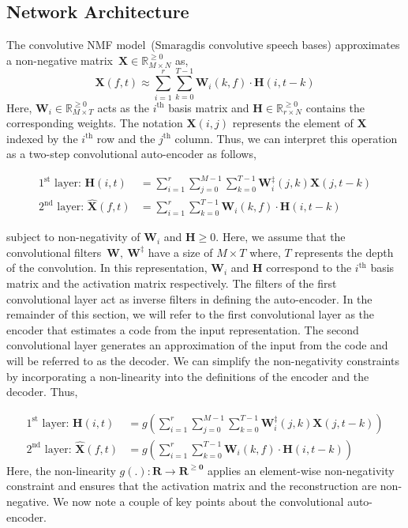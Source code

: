 \documentclass{article}
\begin{document}
\subsection{Network Architecture}
\label{sec:conv-nmf}
The convolutive NMF model~\cite{}(Smaragdis convolutive speech bases) approximates a non-negative matrix~$\mathbf{X}\in \mathbb{R}_{M \times N}^{\geq0}$ as,
\begin{equation}
    \mathbf{X}(f,t) \approx \sum_{i=1}^{r} \sum_{k=0}^{T-1} \mathbf{W}_{i}(k,f)\cdot\mathbf{H}(i,t-k)
\end{equation}
Here, $\mathbf{W}_{i} \in \mathbb{R}_{M \times T}^{\geq0}$ acts as the $i^{\text{th}}$ basis matrix and $\mathbf{H} \in \mathbb{R}_{r \times N}^{\geq0}$ contains the corresponding weights. The notation $\mathbf{X}(i,j)$ represents the element of $\mathbf{X}$ indexed by the $i^{\text{th}}$ row and the $j^{\text{th}}$ column. Thus, we can interpret this operation as a two-step convolutional auto-encoder as follows,

\begin{align}
    \text{$1^{\text{st}}$ layer:~}\mathbf{H}(i,t) &= \sum_{i=1}^{r} \sum_{j=0}^{M-1} \sum_{k=0}^{T-1} \mathbf{W}_{i}^{\ddagger}(j,k)\mathbf{X}(j,t-k) \\
    \text{$2^{\text{nd}}$ layer:~}\hat{\mathbf{X}}(f,t) &= \sum_{i=1}^{r} \sum_{k=0}^{T-1} \mathbf{W}_{i}(k,f)\cdot\mathbf{H}(i,t-k)
    \label{eq:nmfcnncnn}
\end{align}

subject to non-negativity of $\mathbf{W}_{i}$ and $\mathbf{H}\geq0$. Here, we assume that the convolutional filters~$\mathbf{W},~\mathbf{W}^{\ddagger}$ have a size of $M\times T$ where, $T$ represents the depth of the convolution. In this representation, $\mathbf{W}_{i}$ and $\mathbf{H}$ correspond to the $i^{\text{th}}$ basis matrix and the activation matrix respectively. The filters of the first convolutional layer act as inverse filters in defining the auto-encoder. In the remainder of this section, we will refer to the first convolutional layer as the encoder that estimates a code from the input representation. The second convolutional layer generates an approximation of the input from the code and will be referred to as the decoder. We can simplify the non-negativity constraints by incorporating a non-linearity into the definitions of the encoder and the decoder. Thus,

\begin{align}
    \text{$1^{\text{st}}$ layer:~}\mathbf{H}(i,t) &= g\left(\sum_{i=1}^{r} \sum_{j=0}^{M-1} \sum_{k=0}^{T-1} \mathbf{W}_{i}^{\ddagger}(j,k)\mathbf{X}(j,t-k)\right) \\
    \text{$2^{\text{nd}}$ layer:~}\hat{\mathbf{X}}(f,t) &= g\left(\sum_{i=1}^{r} \sum_{k=0}^{T-1} \mathbf{W}_{i}(k,f)\cdot\mathbf{H}(i,t-k)\right)
    \label{eq:nmfcnncnn}
\end{align}
Here, the non-linearity $g(.):\mathbf{R}\rightarrow \mathbf{R^{\geq0}}$ applies an element-wise non-negativity constraint and ensures that the activation matrix and the reconstruction are non-negative. We now note a couple of key points about the convolutional auto-encoder. 
\end{document}
